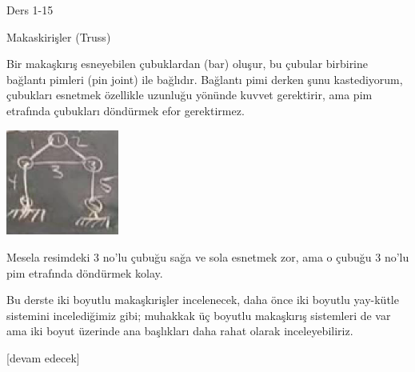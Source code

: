 \documentclass[12pt,fleqn]{article}\usepackage{../../common}
\begin{document}
Ders 1-15

Makaskirişler (Truss)

Bir makaşkırış esneyebilen çubuklardan (bar) oluşur, bu çubular birbirine
bağlantı pimleri (pin joint) ile bağlıdır. Bağlantı pimi derken şunu
kastediyorum, çubukları esnetmek özellikle uzunluğu yönünde kuvvet gerektirir,
ama pim etrafında çubukları döndürmek efor gerektirmez.

\includegraphics[width=10em]{compscieng_1_15_01.png}

Mesela resimdeki 3 no'lu çubuğu sağa ve sola esnetmek zor, ama o çubuğu
3 no'lu pim etrafında döndürmek kolay.

Bu derste iki boyutlu makaşkırişler incelenecek, daha önce iki boyutlu yay-kütle
sistemini incelediğimiz gibi; muhakkak üç boyutlu makaşkırış sistemleri de var
ama iki boyut üzerinde ana başlıkları daha rahat olarak inceleyebiliriz.













[devam edecek]
\end{document}
